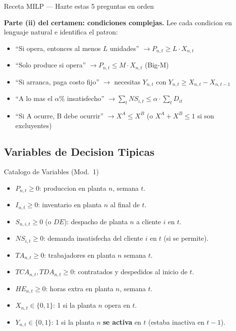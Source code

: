 \documentclass[11pt, a4paper]{article}
\begin{document}
\begin{tipprueba}{Receta MILP --- Hazte estas 5 preguntas en orden}
\begin{enumerate}[leftmargin=1.5em, itemsep=4pt]
  \end{enumerate}

  \medskip
  \textbf{Parte (ii) del certamen: condiciones complejas.}
  Lee cada condicion en lenguaje natural e identifica el patron:
  \begin{itemize}[leftmargin=1.2em, itemsep=2pt]
    \item ``Si opera, entonces al menos $L$ unidades'' $\to P_{n,t} \ge L \cdot X_{n,t}$
    \item ``Solo produce si opera'' $\to P_{n,t} \le M \cdot X_{n,t}$ (Big-M)
    \item ``Si arranca, paga costo fijo'' $\to$ necesitas $Y_{n,t}$ con $Y_{n,t} \ge X_{n,t} - X_{n,t-1}$
    \item ``A lo mas el $\alpha$\% insatisfecho'' $\to \sum_t NS_{i,t} \le \alpha \cdot \sum_t D_{it}$
    \item ``Si A ocurre, B debe ocurrir'' $\to X^A \le X^B$ (o $X^A + X^B \le 1$ si son excluyentes)
  \end{itemize}
\end{tipprueba}

\subsection{Variables de Decision Tipicas}

\begin{definicion}{Catalogo de Variables (Mod.\ 1)}
  \begin{itemize}[leftmargin=1.2em, itemsep=2pt]
    \item $P_{n,t} \ge 0$: produccion en planta $n$, semana $t$.
    \item $I_{n,t} \ge 0$: inventario en planta $n$ al final de $t$.
    \item $S_{n,i,t} \ge 0$ (o $DE$): despacho de planta $n$ a cliente $i$ en $t$.
    \item $NS_{i,t} \ge 0$: demanda insatisfecha del cliente $i$ en $t$ (si se permite).
    \item $TA_{n,t} \ge 0$: trabajadores en planta $n$ semana $t$.
    \item $TCA_{n,t}, TDA_{n,t} \ge 0$: contratados y despedidos al inicio de $t$.
    \item $HE_{n,t} \ge 0$: horas extra en planta $n$, semana $t$.
    \item $X_{n,t} \in \{0,1\}$: 1 si la planta $n$ opera en $t$.
    \item $Y_{n,t} \in \{0,1\}$: 1 si la planta $n$ \textbf{se activa} en $t$
          (estaba inactiva en $t-1$).
  \end{itemize}
\end{definicion}
\end{document}
